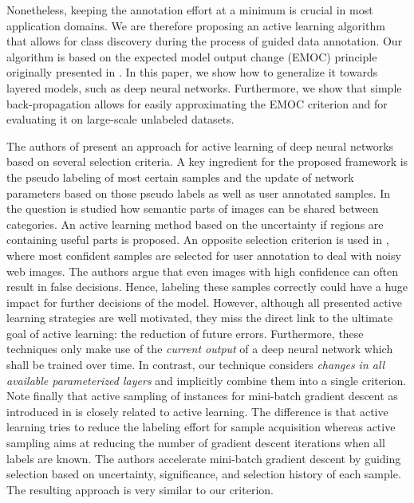 \documentclass{article}
\begin{document}
Nonetheless, keeping the annotation effort at a minimum is crucial in most application domains. %
We are therefore proposing an active learning algorithm that allows for class discovery during the process of guided data annotation.
Our algorithm is based on the expected model output change (EMOC) principle originally presented
in \cite{Freytag14_SIE,Kaeding15_ALD}.
In this paper,
we show how to generalize it towards layered models, such as deep neural networks. Furthermore, we show
that simple back-propagation allows for easily approximating the EMOC criterion and for evaluating it on large-scale unlabeled datasets.


The authors of \cite{wang2016cost} present an approach for active learning of deep neural networks based on several selection criteria.
A key ingredient for the proposed framework is the pseudo labeling of most certain samples and the update of network parameters based on those pseudo labels as well as user annotated samples.
In \cite{novotny16i-have} the question is studied how semantic parts of images can be shared between categories.
An active learning method based on the uncertainty if regions are containing useful parts is proposed.
An opposite selection criterion is used in \cite{krause2015unreasonable},
where most confident samples are selected for user annotation to deal with noisy web images.
The authors argue that even images with high confidence can often result in false decisions.
Hence, labeling these samples correctly could have a huge impact for further decisions of the model.
However,
although all presented active learning strategies are well motivated,
they miss the direct link to the ultimate goal of active learning: the reduction of future errors.
Furthermore,
these techniques only make use of the  \emph{current output} of a deep neural network which shall be trained over time.
In contrast,
our technique considers \emph{changes in all available parameterized layers} and implicitly combine them into a single criterion.
Note finally that active sampling of instances for mini-batch gradient descent as introduced in \cite{gao2015active} is closely related to active learning.
The difference is that active learning tries to reduce the labeling effort for sample acquisition whereas active sampling aims at reducing the number of gradient descent iterations when all labels are known.
The authors accelerate mini-batch gradient descent by guiding selection based on uncertainty, significance, and selection history of each sample.
The resulting approach is very similar to our criterion.
\end{document}
